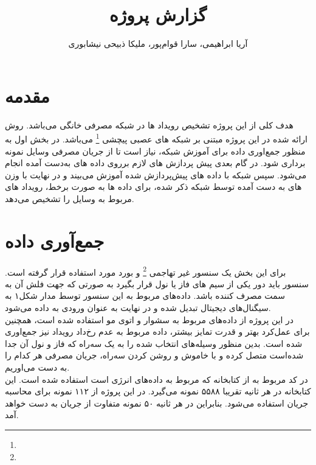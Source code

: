 \documentclass[12pt,onecolumn,a4paper]{article}
\begin{document}
\title{گزارش پروژه } 
\author{آریا ابراهیمی، سارا قوام‌پور، ملیکا ذبیحی نیشابوری\\}

\maketitle

\section{مقدمه} 
هدف کلی از این پروژه تشخیص رویداد ها در شبکه مصرفی خانگی می‌باشد. روش ارائه شده در این پروژه مبتنی بر شبکه های عصبی پیچشی 
\footnote{}
می‌باشد. در بخش اول به منظور جمع‌اوری داده برای آموزش شبکه، نیاز است تا از جریان مصرفی وسایل نمونه برداری شود. در گام بعدی پیش پردازش های لازم بر‌روی داده های به‌دست آمده انجام می‌شود. سپس شبکه با داده های پیش‌پردازش شده آموزش می‌بیند و در نهایت با وزن های به دست آمده توسط شبکه ذکر شده، برای داده ها به صورت برخط، رویداد های مربوط به وسایل را تشخیص می‌دهد.


\section{جمع‌آوری داده‌}

برای این بخش یک سنسور غیر تهاجمی
\footnote{}
و بورد 
مورد استفاده قرار گرفته است. سنسور  باید دور یکی از سیم های فاز یا نول قرار بگیرد به صورتی که جهت فلش آن به سمت مصرف کننده باشد. داده‌های مربوط به این سنسور توسط مدار شکل۱ به سیگنال‌های دیجیتال تبدیل شده و در نهایت به عنوان ورودی به  داده می‌شود.\\
در این پروژه از داده‌های مربوط به سشوار و اتوی مو استفاده شده است، همچنین برای عمل‌کرد بهتر و قدرت تمایز بیشتر، داده مربوط به عدم رخ‌داد رویداد نیز جمع‌اوری شده است. بدین منظور وسیله‌های انتخاب شده را به یک سه‌راه که فاز و نول آن جدا شده‌است متصل کرده و با خاموش و روشن کردن سه‌راه، جریان مصرفی هر کدام را به دست می‌اوریم.\\
در کد مربوط به  از کتابخانه 
که مربوط به داده‌های انرژی است استفاده شده است. این کتابخانه در هر ثانیه تقریبا ۵۵۸۸ نمونه می‌گیرد. در این پروژه از ۱۱۲ نمونه برای محاسبه جریان 
استفاده می‌شود. بنابراین در هر ثانیه ۵۰ نمونه متفاوت از جریان  به دست خواهد آمد.
\end{document}
